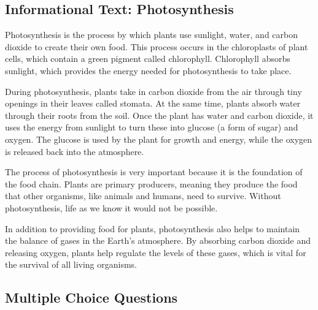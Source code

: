 \documentclass[12pt]{article}
\begin{document}
\onehalfspacing

\subsection*{Informational Text: Photosynthesis}

\begin{tcolorbox}[colframe=black!40, colback=gray!5]

\begin{spacing}{1.15}

Photosynthesis is the process by which plants use sunlight, water, and carbon dioxide to create their own food. This process occurs in the chloroplasts of plant cells, which contain a green pigment called chlorophyll. Chlorophyll absorbs sunlight, which provides the energy needed for photosynthesis to take place.

During photosynthesis, plants take in carbon dioxide from the air through tiny openings in their leaves called stomata. At the same time, plants absorb water through their roots from the soil. Once the plant has water and carbon dioxide, it uses the energy from sunlight to turn these into glucose (a form of sugar) and oxygen. The glucose is used by the plant for growth and energy, while the oxygen is released back into the atmosphere.

The process of photosynthesis is very important because it is the foundation of the food chain. Plants are primary producers, meaning they produce the food that other organisms, like animals and humans, need to survive. Without photosynthesis, life as we know it would not be possible. 

In addition to providing food for plants, photosynthesis also helps to maintain the balance of gases in the Earth's atmosphere. By absorbing carbon dioxide and releasing oxygen, plants help regulate the levels of these gases, which is vital for the survival of all living organisms.

\end{spacing}

\end{tcolorbox}

\subsection*{Multiple Choice Questions}
\end{document}
